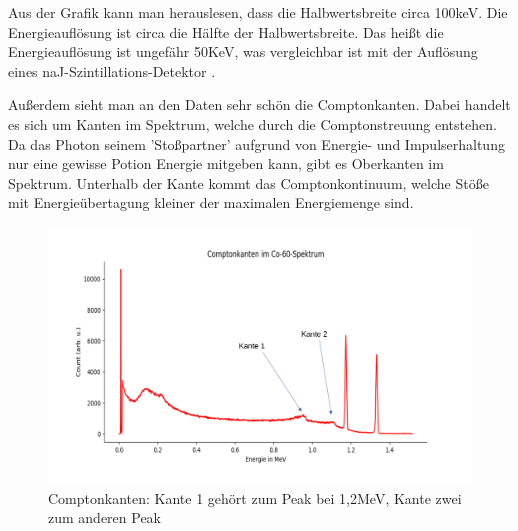 Aus der Grafik kann man herauslesen, dass die Halbwertsbreite circa 100keV. Die Energieauflösung ist circa die Hälfte der Halbwertsbreite. Das heißt 
die Energieauflösung ist ungefähr 50KeV, was vergleichbar ist mit der Auflösung eines naJ-Szintillations-Detektor \cite[S.9]{Kador2021}. 

Außerdem sieht man an den Daten sehr schön die Comptonkanten. Dabei handelt es sich um Kanten im Spektrum, welche durch die Comptonstreuung entstehen. 
Da das Photon seinem 'Stoßpartner' aufgrund von Energie- und Impulserhaltung nur eine gewisse Potion Energie mitgeben kann, gibt es Oberkanten im 
Spektrum. Unterhalb der Kante kommt das Comptonkontinuum, welche Stöße mit Energieübertagung kleiner der maximalen Energiemenge sind.


\begin{figure}[ht]
    \centering
    \includegraphics[width = \linewidth]{Bilder/Auswertung/Comtonkante.png}
    \caption{Comptonkanten: Kante 1 gehört zum Peak bei 1,2MeV, Kante zwei zum anderen Peak}
\end{figure}

\clearpage

